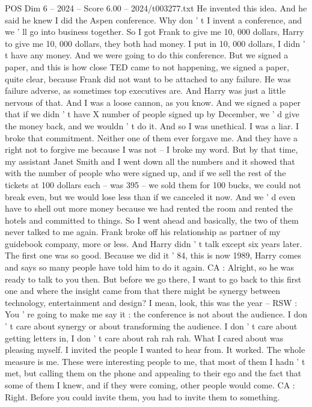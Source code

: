 \begin{textsample}{POS Dim 6 – 2024 – Score 6.00 – 2024/t003277.txt}
He invented this idea.
And he said he knew I did the Aspen conference.
Why don ' t I invent a conference, and we ' ll go into business together.
So I got Frank to give me 10, 000 dollars, Harry to give me 10, 000 dollars, they both had money.
I put in 10, 000 dollars, I didn ' t have any money.
And we were going to do this conference.
But we signed a paper, and this is how close TED came to not happening, we signed a paper, quite clear, because Frank did not want to be attached to any failure.
He was failure adverse, as sometimes top executives are.
And Harry was just a little nervous of that.
And I was a loose cannon, as you know.
And we signed a paper that if we didn ' t have X number of people signed up by December, we ' d give the money back, and we wouldn ' t do it.
And so I was unethical.
I was a liar.
I broke that commitment.
Neither one of them ever forgave me.
And they have a right not to forgive me because I was not -- I broke my word.
But by that time, my assistant Janet Smith and I went down all the numbers and it showed that with the number of people who were signed up, and if we sell the rest of the tickets at 100 dollars each -- was 395 -- we sold them for 100 bucks, we could not break even, but we would lose less than if we canceled it now.
And we ' d even have to shell out more money because we had rented the room and rented the hotels and committed to things.
So I went ahead and basically, the two of them never talked to me again.
Frank broke off his relationship as partner of my guidebook company, more or less.
And Harry didn ' t talk except six years later.
The first one was so good.
Because we did it ' 84, this is now 1989, Harry comes and says so many people have told him to do it again.
CA : Alright, so he was ready to talk to you then.
But before we go there, I want to go back to this first one and where the insight came from that there might be synergy between technology, entertainment and design?
I mean, look, this was the year -- RSW : You ' re going to make me say it : the conference is not about the audience.
I don ' t care about synergy or about transforming the audience.
I don ' t care about getting letters in, I don ' t care about rah rah rah.
What I cared about was pleasing myself.
I invited the people I wanted to hear from.
It worked.
The whole measure is me.
These were interesting people to me, that most of them I hadn ' t met, but calling them on the phone and appealing to their ego and the fact that some of them I knew, and if they were coming, other people would come.
CA : Right.
Before you could invite them, you had to invite them to something.

\end{textsample}
